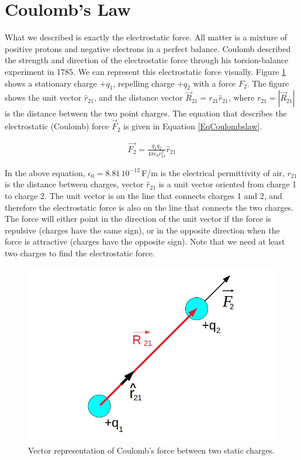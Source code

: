 \documentclass{ximera}
\begin{document}
 
 \section{Coulomb's Law}

What we described is exactly the electrostatic force. All matter is a mixture of positive protons and negative electrons in a perfect balance. Coulomb described the strength and direction of the electrostatic force through his torsion-balance experiment in 1785.  We can represent this electrostatic force visually. Figure \ref{twostaticch} shows a stationary charge $+q_1$, repelling charge $+q_2$ with a force $F_{2}$. The figure shows the unit vector $\hat{r}_{21}$, and the distance vector $\vec{R}_{21}=r_{21} \hat{r}_{21}$, where $r_{21}=|\vec{R}_{21}|$ is the distance between the two point charges. The equation that describes the electrostatic (Coulomb) force $\vec{F}_2$ is given in Equation \ref{EqCoulombslaw}.


\begin{eqnarray}
\vec{F_2}=\frac{q_1 q_2}{4 \pi \epsilon_0 r_{21}^2} \hat{r}_{21} \label{EqCoulombslaw}
\end{eqnarray}

In the above equation, $\epsilon_0=8.81\, 10^{-12}$\,F/m is the electrical permittivity of air, $r_{21}$ is the distance between charges, vector $\hat{r}_{21}$ is a unit vector oriented from charge 1 to charge 2. The unit vector is on the line that connects charges 1 and 2, and therefore the electrostatic force is also on the line that connects the two charges. The force will either point in the direction of the unit vector if the force is repulsive (charges have the same sign), or in the opposite direction when the force is attractive (charges have the opposite sign). Note that we need at least two charges to find the electrostatic force.


\begin{figure}[htbp]
\begin{center}
\includegraphics[scale=0.5]{../jpg/Two_Static_ChargesV1.jpg}
\end{center}
\caption{Vector representation of Coulomb's force between two static charges.}
\label{twostaticch}
\end{figure}
\end{document}
